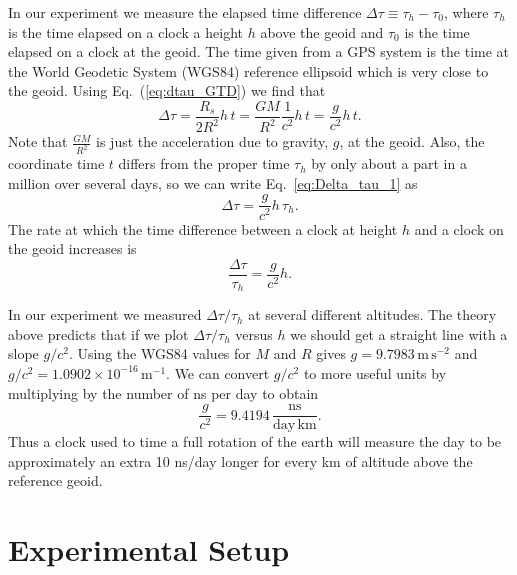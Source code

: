 \documentclass[prb,preprint]{revtex4-1}
\begin{document}
In our experiment we measure the elapsed time difference $\Delta \tau \equiv \tau_h - \tau_0$, where $\tau_h$ is the time elapsed on a clock a height $h$ above the geoid and $\tau_0$ is the time elapsed on a clock at the geoid. The time given from a GPS system is the time at the World Geodetic System (WGS84) reference ellipsoid which is very close to the geoid.\cite{ashby2003} Using Eq.~(\ref{eq:dtau_GTD}) we find that
\begin{equation}
\label{eq:Delta_tau_1}
\Delta \tau = \frac{R_s}{2R^2} h\, t= \frac{GM}{R^2} \frac{1}{c^2}h\, t = \frac{g}{c^2}h\, t.
\end{equation}
Note that $\frac{GM}{R^2}$ is just the acceleration due to gravity, $g$, at the geoid. Also, the coordinate time $t$ differs from the proper time $\tau_h$ by only about a part in a million over several days, so we can write Eq.~\ref{eq:Delta_tau_1} as
\begin{equation}
\label{eq:Delta_tau}
\Delta\tau = \frac{g}{c^2} h\, \tau_h.
\end{equation}
The rate at which the time difference between a clock at height $h$ and a clock on the geoid increases is
\begin{equation}
\label{eq:rate}
\frac{\Delta\tau}{\tau_h} = \frac{g}{c^2} h.
\end{equation}

In our experiment we measured $\Delta \tau / \tau_h$ at several different altitudes. The theory above predicts that if we plot $\Delta \tau / \tau_h$ versus $h$ we should get a straight line with a slope $g/c^2$. Using the WGS84 values for $M$ and $R$ gives $g = 9.7983\, \mathrm{m\, s}^{-2}$ and $g/c^2 = 1.0902 \times 10^{-16}\, \mathrm{m}^{-1}$. We can convert $g/c^2$ to more useful units by multiplying by the number of ns per day to obtain
\begin{equation}
\label{eq:prediction}
\frac{g}{c^2} = 9.4194\,  \frac{\mathrm{ns}}{\mathrm{day\, km}}.
\end{equation} 
Thus a clock used to time a full rotation of the earth will measure the day to be approximately an extra 10 ns/day longer for every km of altitude above the reference geoid. 

\section{Experimental Setup}
\end{document}
